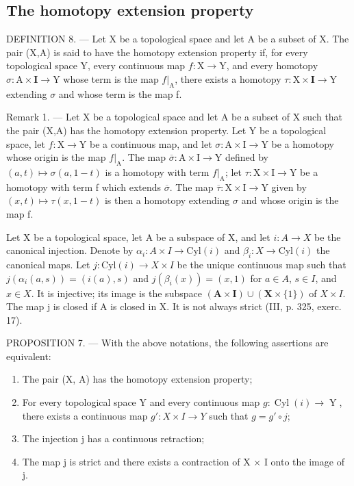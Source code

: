 \subsection{The homotopy extension property}

DEFINITION 8. --- Let X be a topological space and let A be a subset of X. The pair (X,A) is said to have the homotopy extension property if, for every topological space Y, every continuous map \(f:\mathrm{X}\to\mathrm{Y}\), and every homotopy \(\sigma:\mathrm{A}\times\mathbf{I}\to\mathrm{Y}\) whose term is the map \(f|_{\mathrm{A}}\), there exists a homotopy \(\tau:\mathrm{X}\times\mathbf{I}\to\mathrm{Y}\) extending \(\sigma\) and whose term is the map f.

Remark 1. --- Let X be a topological space and let A be a subset of X such that the pair (X,A) has the homotopy extension property. Let Y be a topological space, let \(f:\mathrm{X}\to\mathrm{Y}\) be a continuous map, and let \(\sigma:\mathrm{A}\times\mathrm{I}\to\mathrm{Y}\) be a homotopy whose origin is the map \(f|_{\mathrm{A}}\). The map \(\overline{\sigma}:\mathrm{A}\times\mathrm{I}\to\mathrm{Y}\) defined by \((a,t)\mapsto\sigma(a,1-t)\) is a homotopy with term \(f|_{\mathrm{A}}\); let \(\tau:\mathrm{X}\times\mathrm{I}\to\mathrm{Y}\) be a homotopy with term f which extends \(\overline{\sigma}\). The map \(\overline{\tau}:\mathrm{X}\times\mathrm{I}\to\mathrm{Y}\) given by \((x,t)\mapsto\tau(x,1-t)\) is then a homotopy extending \(\sigma\) and whose origin is the map f.

Let X be a topological space, let A be a subspace of X, and let \(i: A \to X\) be the canonical injection. Denote by \(\alpha_{i}: A \times I \to \text{Cyl}(i)\) and \(\beta_{i}: X \to \text{Cyl}(i)\) the canonical maps. Let \(j: \text{Cyl}(i) \to X \times I\) be the unique continuous map such that \(j(\alpha_{i}(a, s)) = (i(a), s)\) and \(j(\beta_{i}(x)) = (x, 1)\) for \(a \in A\), \(s \in I\), and \(x \in X\). It is injective; its image is the subspace \((\mathbf{A} \times \mathbf{I}) \cup (\mathbf{X} \times \{1\})\) of \(X \times I\). The map j is closed if A is closed in X. It is not always strict (III, p. 325, exerc. 17).

PROPOSITION 7. --- With the above notations, the following assertions are equivalent:

\begin{enumerate}
\def\labelenumi{(\roman{enumi})}
\item
  The pair (X, A) has the homotopy extension property;
\item
  For every topological space Y and every continuous map \(g\colon \operatorname{Cyl}(i) \to \operatorname{Y}\), there exists a continuous map \(g'\colon X \times I \to Y\) such that \(g = g' \circ j\);
\item
  The injection j has a continuous retraction;
\item
  The map j is strict and there exists a contraction of X × I onto the image of j.
\end{enumerate}

